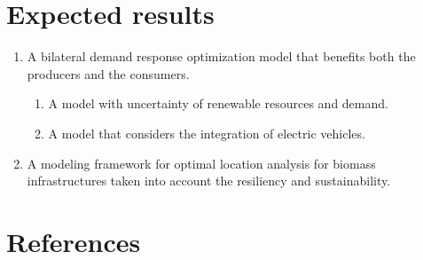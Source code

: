 \documentclass[12pt]{report}
\begin{document}
\section{Expected results}
\begin{enumerate}[label=\arabic*.]
  \item A bilateral demand response optimization model that benefits both the producers and the consumers.
    \begin{enumerate}[label=\alph*., leftmargin=*]
      \item A model with uncertainty of renewable resources and demand.
      \item A model that considers the integration of electric vehicles.
    \end{enumerate}
  \item A modeling framework for optimal location analysis for biomass infrastructures taken into account the resiliency and sustainability.
\end{enumerate}


\section{References}

\renewcommand{\bibname}{\vspace{-2em}}


\end{document}
